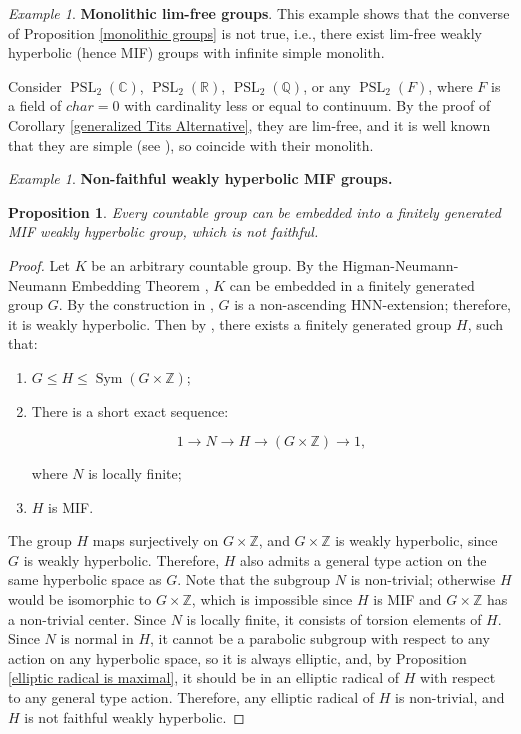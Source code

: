 \documentclass[11pt,letterpaper]{article}
\newcommand{\ZZ}{\mathbb{Z}}
\newcommand{\RR}{\mathbb{R}}
\newcommand{\CC}{\mathbb{C}}
\DeclareMathOperator{\PSL}{PSL}
\newtheorem{prop}[thm]{Proposition}
\theoremstyle{definition}
\theoremstyle{remark}
\newtheorem{ex}[thm]{Example}
\begin{document}
\begin{ex}{\bf Monolithic lim-free groups}. This example shows that the converse of Proposition \ref{monolithic groups} is not true, i.e., there exist lim-free weakly hyperbolic (hence MIF) groups with infinite simple monolith.

Consider $\PSL_2(\CC)$, $\PSL_2(\RR)$, $\PSL_2(\mathbb{Q})$, or any $\PSL_2(F)$, where $F$ is a field of $char=0$ with cardinality less or equal to continuum. By the proof of Corollary \ref{generalized Tits Alternative}, they are lim-free, and it is well known that they are simple (see \cite{Dix}), so coincide with their monolith.
\end{ex}
\begin{ex}{\bf Non-faithful weakly hyperbolic MIF groups.}\label{example H}
\end{ex}
\begin{prop}\label{construction of MIF WH not FWH groups}
Every countable group can be embedded into a finitely generated MIF weakly hyperbolic group, which is not faithful.
\end{prop}
\begin{proof} Let $K$ be an arbitrary countable group. By the Higman-Neumann-Neumann Embedding Theorem \cite{HNN}, $K$ can be embedded in a finitely generated group $G$. By the construction in \cite{HNN}, $G$ is a non-ascending HNN-extension; therefore, it is weakly hyperbolic. Then by \cite[Thm 1.1]{HL}, there exists a finitely generated group $H$, such that:
\begin{enumerate}
    \item $G \leq H \leq \operatorname{Sym}(G \times \ZZ)$;
    \item There is a short exact sequence:

$$
1 \longrightarrow N \longrightarrow H \longrightarrow(G \times \ZZ) \longrightarrow 1,
$$

where $N$ is locally finite;
\item  $H$ is MIF.
\end{enumerate}
The group $H$ maps surjectively on $G \times \ZZ$, and $G \times \ZZ$ is weakly hyperbolic, since $G$ is weakly hyperbolic. Therefore, $H$ also admits a general type action on the same hyperbolic space as $G$. Note that the subgroup $N$ is non-trivial; otherwise $H$ would be isomorphic to $G \times \ZZ$, which is impossible since $H$ is MIF and  $G \times \ZZ$ has a non-trivial center. Since $N$ is locally finite, it consists of torsion elements of $H$. Since $N$ is normal in $H$, it cannot be a parabolic subgroup with respect to any action on any hyperbolic space, so it is always elliptic, and, by Proposition \ref{elliptic radical is maximal}, it should be in an elliptic radical of $H$ with respect to any general type action. Therefore, any elliptic radical of $H$ is non-trivial, and $H$ is not faithful weakly hyperbolic. 
\end{proof}
\end{document}

